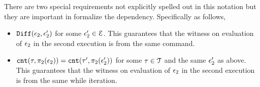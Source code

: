 There are two special requirements not explicitly spelled out in this notation but they are 
important in formalize the 
dependency. 
Specifically as follows,
\begin{itemize}
\item $\mathtt{Diff}(\mathtt{\epsilon}_2, \mathtt{\epsilon}_2')$ for some $\mathtt{\epsilon}_2' \in \mathcal{E}$. 
This guarantees that the witness on evaluation of $\mathtt{\epsilon}_2$ in the second execution is 
from the same command.
\item $\mathtt{cnt}(\mathtt{\tau}, \pi_2(\mathtt{\epsilon}_2))
= 
\mathtt{cnt}(\mathtt{\tau}', \pi_2(\mathtt{\epsilon}_2'))$ for some $\mathtt{\tau} \in \mathcal{T}$ and the same $\mathtt{\epsilon}_2'$ as above.
This guarantees that the witness on evaluation of $\mathtt{\epsilon}_2$ in the second execution is 
from the same while iteration.
\end{itemize}
